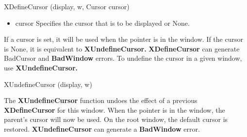 \documentclass{report}
\begin{document}
\begin{itemize}
            \begin{cppcode}
                XDefineCursor (display, w, Cursor cursor)
            \end{cppcode}
            \bigbreak \noindent
            \begin{itemize}
                \item cursor Specifies the cursor that is to be displayed or None.
            \end{itemize}
            If a cursor is set, it will be used when the pointer is in the window. If the cursor is None, it is equivalent to \textbf{XUndefineCursor.} \textbf{XDefineCursor} can generate BadCursor and \textbf{BadWindow} errors.
            \bigbreak \noindent 
            To undefine the cursor in a given window, use \textbf{XUndefineCursor.}
            \bigbreak \noindent 
            \begin{cppcode}
                XUndefineCursor (display, w)
            \end{cppcode}
            The \textbf{XUndefineCursor} function undoes the effect of a previous \textbf{XDefineCursor} for this window. When the pointer is in the window, the parent’s cursor will now be used. On the root window, the default cursor is restored.
            \bigbreak \noindent 
            \textbf{XUndefineCursor} can generate a \textbf{BadWindow} error.

    \end{itemize}
\end{document}
